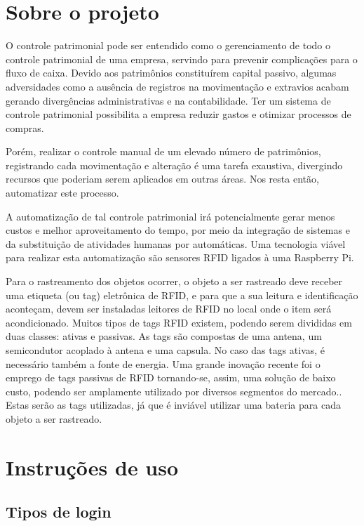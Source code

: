 \documentclass[
	12pt,				%
	openright,			%
	oneside,			%
	a4paper,			%
	english,			%
	french,				%
	spanish,			%
	brazil				%
	]{abntex2}
\begin{document}
\chapter{Sobre o projeto}

O controle patrimonial pode ser entendido como o gerenciamento de todo o controle patrimonial de uma empresa, servindo para prevenir complicações para o fluxo de caixa.\cite{marcia2017patrimonial} Devido aos patrimônios constituírem capital passivo, algumas adversidades como a ausência de registros na movimentação e extravios acabam gerando divergências administrativas e na contabilidade. Ter um sistema de controle patrimonial possibilita a empresa reduzir gastos e otimizar processos de compras. 

Porém, realizar o controle manual de um elevado número de patrimônios, registrando cada movimentação e alteração é uma tarefa exaustiva, divergindo recursos que poderiam serem aplicados em outras áreas. Nos resta então, automatizar este processo.

A automatização de tal controle patrimonial irá potencialmente gerar menos custos e melhor aproveitamento do tempo, por meio da integração de sistemas e da substituição de atividades humanas por automáticas.\cite{marcus2016automatizar} Uma tecnologia viável para realizar esta automatização são sensores RFID ligados à uma Raspberry Pi.

Para o rastreamento dos objetos ocorrer, o objeto a ser rastreado deve receber uma etiqueta (ou tag) eletrônica de RFID, e para que a sua leitura e identificação aconteçam, devem ser instaladas leitores de RFID no local onde o item será acondicionado.\cite{rfidbrasil} Muitos tipos de tags RFID existem, podendo serem divididas em duas classes: ativas e passivas. As tags são compostas de uma antena, um semicondutor acoplado à antena e uma capsula. No caso das tags ativas, é necessário também a fonte de energia.\cite{want2006introduction} Uma grande inovação recente foi o emprego de tags passivas de RFID tornando-se, assim,  uma solução de baixo custo, podendo ser amplamente utilizado por diversos segmentos do mercado.\cite{rfidbrasil}. Estas serão as tags utilizadas, já que é inviável utilizar uma bateria para cada objeto a ser rastreado.

\chapter{Instruções de uso}

\section{Tipos de login}
\end{document}
